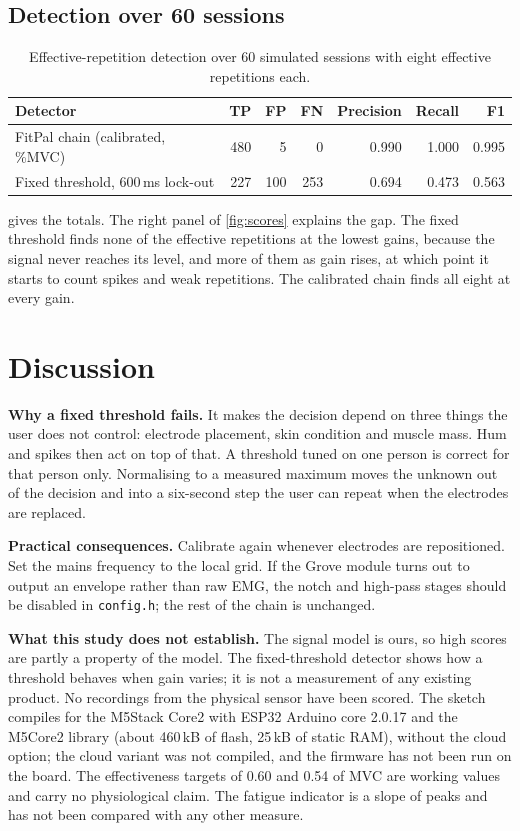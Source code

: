 \documentclass[11pt,letterpaper]{article}
\begin{document}
\subsection{Detection over 60 sessions}
\begin{table}[t]\centering\small
\begin{tabular}{@{}lrrrrrr@{}}\toprule
Detector & TP & FP & FN & Precision & Recall & F1\\\midrule
FitPal chain (calibrated, \%MVC) & 480 & 5 & 0 & 0.990 & 1.000 & 0.995\\
Fixed threshold, 600\,ms lock-out & 227 & 100 & 253 & 0.694 & 0.473 & 0.563\\\bottomrule
\end{tabular}
\caption{Effective-repetition detection over 60 simulated sessions with eight effective repetitions each.}\label{tab:scores}
\end{table}
 gives the totals. The right panel of \cref{fig:scores} explains the gap. The fixed threshold finds none of the effective repetitions at the lowest gains, because the signal never reaches its level, and more of them as gain rises, at which point it starts to count spikes and weak repetitions. The calibrated chain finds all eight at every gain.

\section{Discussion}\label{sec:discussion}
\textbf{Why a fixed threshold fails.} It makes the decision depend on three things the user does not control: electrode placement, skin condition and muscle mass. Hum and spikes then act on top of that. A threshold tuned on one person is correct for that person only. Normalising to a measured maximum moves the unknown out of the decision and into a six-second step the user can repeat when the electrodes are replaced.

\textbf{Practical consequences.} Calibrate again whenever electrodes are repositioned. Set the mains frequency to the local grid. If the Grove module turns out to output an envelope rather than raw EMG, the notch and high-pass stages should be disabled in \texttt{config.h}; the rest of the chain is unchanged.

\textbf{What this study does not establish.} The signal model is ours, so high scores are partly a property of the model. The fixed-threshold detector shows how a threshold behaves when gain varies; it is not a measurement of any existing product. No recordings from the physical sensor have been scored. The sketch compiles for the M5Stack Core2 with ESP32 Arduino core 2.0.17 and the M5Core2 library (about 460\,kB of flash, 25\,kB of static RAM), without the cloud option; the cloud variant was not compiled, and the firmware has not been run on the board. The effectiveness targets of 0.60 and 0.54 of MVC are working values and carry no physiological claim. The fatigue indicator is a slope of peaks and has not been compared with any other measure.
\end{document}
